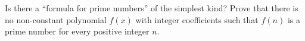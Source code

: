 Is there a ``formula for prime numbers'' of the simplest kind? Prove that there is no non-constant polynomial $f(x)$ with integer coefficients such that $f(n)$ is a prime number for every positive integer $n$.
